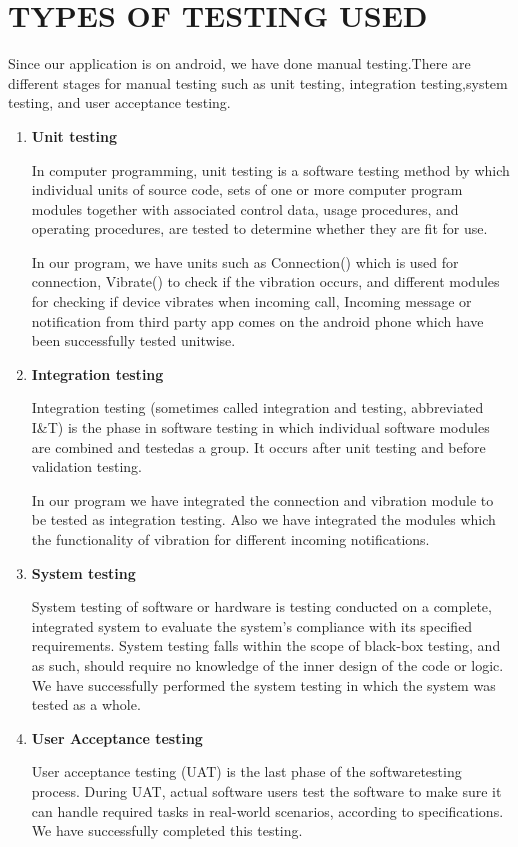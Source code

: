 \documentclass[12pt,a4paper]{report}
\begin{document}
\section{TYPES OF TESTING USED}
\hspace{0.2 in}Since our application is on android, we have done manual testing.There are different stages for manual testing such as unit testing, integration testing,system testing, and user acceptance testing.
\begin{enumerate}
	\item \textbf{Unit testing}
	
	\hspace{0.2 in}In computer programming, unit testing is a software testing method by which individual units of source code, sets of one or more computer program modules together with associated control data, usage procedures, and operating procedures, are tested to determine whether they are fit for use.
	
	\hspace{0.2 in}In our program, we have units such as Connection() which is used for connection, Vibrate() to check if the vibration occurs, and different modules for checking if device vibrates when incoming call, Incoming message or notification from third party app comes on the android phone which have been successfully tested unitwise.
	\item \textbf{Integration testing}
	
	\hspace{0.2 in}Integration testing (sometimes called integration and testing, abbreviated I\&T) is the phase in software testing in which individual software modules are combined and testedas a group. It occurs after unit testing and before validation testing.
	
	\hspace{0.2 in}In our program we have integrated the connection and vibration module to be tested as integration testing. Also we have integrated the modules which the functionality of vibration for different incoming notifications.
	\item \textbf{System testing}
	
	\hspace{0.2 in}System testing of software or hardware is testing conducted on a complete, integrated system to evaluate the system's compliance with its specified requirements. System testing falls within the scope of black-box testing, and as such, should require no knowledge of the inner design of the code or logic.
	\hspace{0.2 in}We have successfully performed the system testing in which the system was tested as a whole.
	\item \textbf{User Acceptance testing}
	
	\hspace{0.2 in}User acceptance testing (UAT) is the last phase of the softwaretesting process. During UAT, actual software users test the software to make sure it can handle required tasks in real-world scenarios, according to specifications. We have successfully completed this testing.
\end{enumerate}
\end{document}
